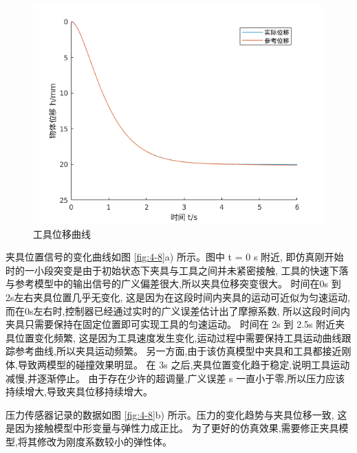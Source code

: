 \begin{figure}[!ht]
  \centering
  \includegraphics[width=12cm]{chapter04/pic/h_f}
  \caption{工具位移曲线}
  \label{fig:4-7}
  \vspace{-0.3cm}
\end{figure}


夹具位置信号的变化曲线如图 \ref{fig:4-8}a) 所示。图中 t = 0 s 附近,
即仿真刚开始时的一小段突变是由于初始状态下夹具与工具之间并未紧密接触,
工具的快速下落与参考模型中的输出信号的广义偏差很大,所以夹具位移突变很大。
时间在0s 到 2s左右夹具位置几乎无变化, 这是因为在这段时间内夹具的运动可近似为匀速运动,
而在0s左右时,控制器已经通过实时的广义误差估计出了摩擦系数,
所以这段时间内夹具只需要保持在固定位置即可实现工具的匀速运动。
时间在 2s 到 2.5s 附近夹具位置变化频繁,
这是因为工具速度发生变化,运动过程中需要保持工具运动曲线跟踪参考曲线,所以夹具运动频繁。
另一方面,由于该仿真模型中夹具和工具都接近刚体,导致两模型的碰撞效果明显。
在 3s 之后,夹具位置变化趋于稳定,说明工具运动减慢,并逐渐停止。
由于存在少许的超调量,广义误差 s 一直小于零,所以压力应该持续增大,导致夹具位移持续增大。


压力传感器记录的数据如图 \ref{fig:4-8}b) 所示。压力的变化趋势与夹具位移一致,
这是因为接触模型中形变量与弹性力成正比。
为了更好的仿真效果,需要修正夹具模型,将其修改为刚度系数较小的弹性体。


